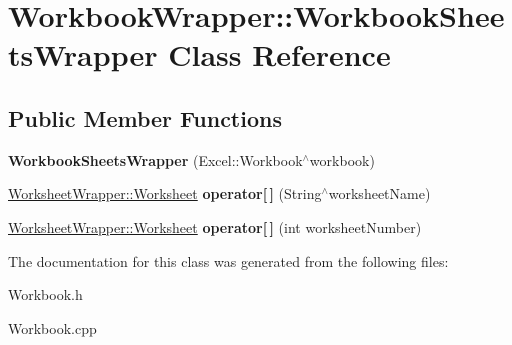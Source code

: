 \hypertarget{class_workbook_wrapper_1_1_workbook_sheets_wrapper}{}\section{Workbook\+Wrapper\+:\+:Workbook\+Sheets\+Wrapper Class Reference}
\label{class_workbook_wrapper_1_1_workbook_sheets_wrapper}
\subsection*{Public Member Functions}
\begin{DoxyCompactItemize}
\item 
\hypertarget{class_workbook_wrapper_1_1_workbook_sheets_wrapper_a4e3774e38d74a6426fe398d6caa99d8b}{}{\bfseries Workbook\+Sheets\+Wrapper} (Excel\+::\+Workbook$^\wedge$workbook)\label{class_workbook_wrapper_1_1_workbook_sheets_wrapper_a4e3774e38d74a6426fe398d6caa99d8b}

\item 
\hypertarget{class_workbook_wrapper_1_1_workbook_sheets_wrapper_ab5a424591410a7edf0c4af773a0084c4}{}\hyperlink{class_worksheet_wrapper_1_1_worksheet}{Worksheet\+Wrapper\+::\+Worksheet} {\bfseries operator\mbox{[}$\,$\mbox{]}} (String$^\wedge$worksheet\+Name)\label{class_workbook_wrapper_1_1_workbook_sheets_wrapper_ab5a424591410a7edf0c4af773a0084c4}

\item 
\hypertarget{class_workbook_wrapper_1_1_workbook_sheets_wrapper_a5472f7eaa77a4f40dcda1147b9b7bda9}{}\hyperlink{class_worksheet_wrapper_1_1_worksheet}{Worksheet\+Wrapper\+::\+Worksheet} {\bfseries operator\mbox{[}$\,$\mbox{]}} (int worksheet\+Number)\label{class_workbook_wrapper_1_1_workbook_sheets_wrapper_a5472f7eaa77a4f40dcda1147b9b7bda9}

\end{DoxyCompactItemize}


The documentation for this class was generated from the following files\+:\begin{DoxyCompactItemize}
\item 
Workbook.\+h\item 
Workbook.\+cpp\end{DoxyCompactItemize}
